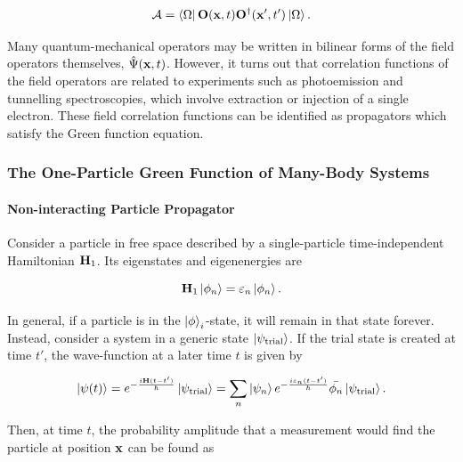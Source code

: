 $$
    \mathcal{A} = \bra{\Omega} {{\bf O}}({{\bf x}}, t) {{\bf O}}^\dagger({{\bf x}}', t') \ket{\Omega}.
$$

Many quantum-mechanical operators may be written in bilinear forms of the field operators themselves, $\hat{\Psi}({{\bf x}}, t)$. However, it turns out that correlation functions of the field operators are related to experiments such as photoemission and tunnelling spectroscopies, which involve extraction or injection of a single electron. These field correlation functions can be identified as propagators which satisfy the Green function equation. \\

\subsubsection{The One-Particle Green Function of Many-Body Systems}

\paragraph{Non-interacting Particle Propagator}

Consider a particle in free space described by a single-particle time-independent Hamiltonian ${\bf H}_1$. Its eigenstates and eigenenergies are 

$$
    {\bf H}_1 \ket{\phi_n} = \varepsilon_n \ket{\phi_n}.
$$

In general, if a particle is in the $\ket{\phi}_i$-state, it will remain in that state forever. Instead, consider a system in a generic state $\ket{\psi_{\textnormal{trial}}}$. If the trial state is created at time $t'$, the wave-function at a later time $t$ is given by 

$$
    \ket{\psi(t)} = e^{-\frac{i {\bf H} (t-t')}{\hbar}} \ket{\psi_{\textnormal{trial}}} = \sum_{n} \ket{\psi_n} e^{-\frac{i \varepsilon_n (t-t')}{\hbar}} \bar{\phi_n}\ket{\psi_{\textnormal{trial}}}.
$$

Then, at time $t$, the probability amplitude that a measurement would find the particle at position ${\bf x}$ can be found as

